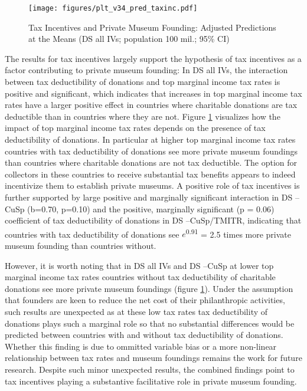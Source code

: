 \documentclass[11pt, authoryear]{elsarticle}
\begin{document}
\begin{figure}[htbp]
\centering
\texttt{[image: figures/plt\_v34\_pred\_taxinc.pdf]}
\caption{\label{fig:pred_taxinc}Tax Incentives and Private Museum Founding: Adjusted Predictions at the Means (DS all IVs; population 100 mil.; 95\% CI)}
\end{figure}

The results for tax incentives largely support the hypothesis of tax incentives as a factor contributing to private museum founding:
In DS all IVs, the interaction between tax deductibility of donations and top marginal income tax rates is positive and significant, which indicates that increases in top marginal income tax rates have a larger positive effect in countries where charitable donations are tax deductible than in countries where they are not.
Figure \ref{fig:pred_taxinc} visualizes how the impact of top marginal income tax rates depends on the presence of tax deductibility of donations.
In particular at higher top marginal income tax rates countries with tax deductibility of donations see more private museum foundings than countries where charitable donations are not tax deductible.
The option for collectors in these countries to receive substantial tax benefits appears to indeed incentivize them to establish private museums.
A positive role of tax incentives is further supported by large positive and marginally significant interaction in DS --CuSp (b=0.70, p=0.10) and the positive, marginally significant (p = 0.06) coefficient of tax deductibility of donations in DS --CuSp/TMITR, indicating that countries with tax deductibility of donations see \(e\)\textsuperscript{0.91} = 2.5 times more private museum founding than countries without. 




However, it is worth noting that in DS all IVs and DS --CuSp at lower top marginal income tax rates countries without tax deductibility of charitable donations see more private museum foundings (figure \ref{fig:pred_taxinc}).
Under the assumption that founders are keen to reduce the net cost of their philanthropic activities, such results are unexpected as at these low tax rates tax deductibility of donations plays such a marginal role so that no substantial differences would be predicted between countries with and without tax deductibility of donations.  
Whether this finding is due to ommitted variable bias or a more non-linear relationship between tax rates and museum foundings remains the work for future research.
Despite such minor unexpected results, the combined findings point to tax incentives playing a substantive facilitative role in private museum founding. 
\end{document}
